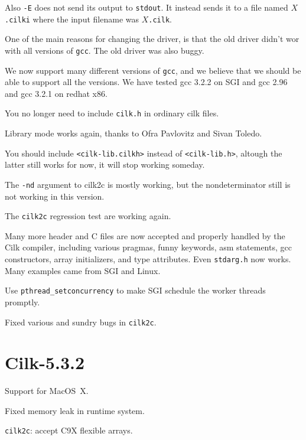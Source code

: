 \begin{closeitemize}
Also \verb+-E+ does not send its output to \texttt{stdout}.  It
instead sends it to a file named \texttt{$X$.cilki} where the input
filename was \texttt{$X$.cilk}.

One of the main reasons for changing the driver, is that the old
driver didn't wor with all versions of \texttt{gcc}.  The old driver
was also buggy.

\item We now support many different versions of \texttt{gcc}, and we
believe that we should be able to support all the versions.  We have tested gcc 3.2.2 on SGI and gcc 2.96 and gcc 3.2.1 on redhat x86.

\item You no longer need to include \texttt{cilk.h} in ordinary cilk files.

\item Library mode works again, thanks to Ofra Pavlovitz and Sivan
Toledo.

\item You should include \texttt{<cilk-lib.cilkh>} instead of
 \texttt{<cilk-lib.h>}, altough the latter still works for now, it
 will stop working someday.

\item The \texttt{-nd} argument to cilk2c is mostly working, but the
nondeterminator still is not working in this version.

\item The \texttt{cilk2c} regression test are working again.

\item Many more header and C files are now accepted and properly
handled by the Cilk compiler, including various pragmas, funny
keywords, asm statements, gcc constructors, array initializers, and
type attributes.  Even \texttt{stdarg.h} now works. Many examples came
from SGI and Linux.

\item Use \texttt{pthread\_setconcurrency} to make SGI schedule the
worker threads promptly.

\item Fixed various and sundry bugs in \texttt{cilk2c}.


\end{closeitemize}

\section*{Cilk-5.3.2}
\begin{closeitemize}
\item Support for MacOS~X.

\item Fixed memory leak in runtime system.

\item \texttt{cilk2c}: accept C9X flexible arrays.
\end{closeitemize}

